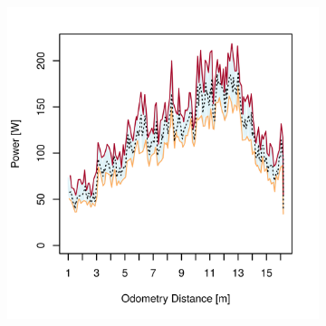 \begin{figure}[h]
\captionsetup[subfigure]{justification=centering}
\vspace{-2ex}
	\centering
    \setlength{\subfigureWidth}{0.32\textwidth}
    \setlength{\graphicsHeight}{50mm}
    \hypersetup{hidelinks=true}%
	\begin{subfigure}[t]{\subfigureWidth}
        \centering
        \includegraphics[height=\graphicsHeight]{sections/design/power-budget/plots/locomotion-power-draw-on-upslope-terrain.png}
		\label{fig:plot:sub:sherpatt-disaggregated-upslope-terrain-power-draw-locomotion}
	\end{subfigure}\hfill
	\begin{subfigure}[t]{\subfigureWidth}
        \centering

\end{subfigure}
\end{figure}
